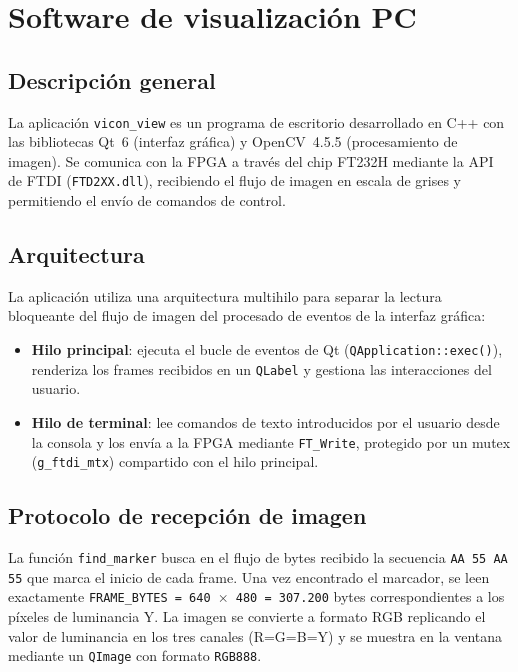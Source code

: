 \documentclass[../main.tex]{subfiles}
\begin{document}
\chapter{Software de visualización PC}
\label{chap:software}

\section{Descripción general}

La aplicación \texttt{vicon\_view} es un programa de escritorio desarrollado en C++ con las bibliotecas Qt~6 (interfaz gráfica) y OpenCV~4.5.5 (procesamiento de imagen). Se comunica con la FPGA a través del chip FT232H mediante la API de FTDI (\texttt{FTD2XX.dll}), recibiendo el flujo de imagen en escala de grises y permitiendo el envío de comandos de control.

\section{Arquitectura}

La aplicación utiliza una arquitectura multihilo para separar la lectura bloqueante del flujo de imagen del procesado de eventos de la interfaz gráfica:

\begin{itemize}
    \item \textbf{Hilo principal}: ejecuta el bucle de eventos de Qt (\texttt{QApplication::exec()}), renderiza los frames recibidos en un \texttt{QLabel} y gestiona las interacciones del usuario.
    \item \textbf{Hilo de terminal}: lee comandos de texto introducidos por el usuario desde la consola y los envía a la FPGA mediante \texttt{FT\_Write}, protegido por un mutex (\texttt{g\_ftdi\_mtx}) compartido con el hilo principal.
\end{itemize}

\section{Protocolo de recepción de imagen}

La función \texttt{find\_marker} busca en el flujo de bytes recibido la secuencia \texttt{AA 55 AA 55} que marca el inicio de cada frame. Una vez encontrado el marcador, se leen exactamente \texttt{FRAME\_BYTES = 640 $\times$ 480 = 307.200} bytes correspondientes a los píxeles de luminancia Y. La imagen se convierte a formato RGB replicando el valor de luminancia en los tres canales (R=G=B=Y) y se muestra en la ventana mediante un \texttt{QImage} con formato \texttt{RGB888}.
\end{document}
